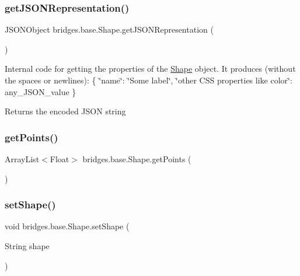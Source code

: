 \mbox{\label{classbridges_1_1base_1_1_shape_a0825361728503d29732b75d6344563d5}} 
\subsubsection{\texorpdfstring{get\+J\+S\+O\+N\+Representation()}{getJSONRepresentation()}}
{\footnotesize\ttfamily J\+S\+O\+N\+Object bridges.\+base.\+Shape.\+get\+J\+S\+O\+N\+Representation (\begin{DoxyParamCaption}{ }\end{DoxyParamCaption})}

Internal code for getting the properties of the \mbox{\hyperlink{classbridges_1_1base_1_1_shape}{Shape}} object. It produces (without the spaces or newlines)\+: \{ \char`\"{}name\char`\"{}\+: \char`\"{}\+Some label\char`\"{}, \char`\"{}other C\+S\+S properties like color\char`\"{}\+: any\+\_\+\+J\+S\+O\+N\+\_\+value \} \begin{DoxyReturn}{Returns}
the encoded J\+S\+ON string 
\end{DoxyReturn}
\mbox{\label{classbridges_1_1base_1_1_shape_ad8addc2d4ba18e1818648b8992ef1a0c}} 
\subsubsection{\texorpdfstring{get\+Points()}{getPoints()}}
{\footnotesize\ttfamily Array\+List$<$Float$>$ bridges.\+base.\+Shape.\+get\+Points (\begin{DoxyParamCaption}{ }\end{DoxyParamCaption})}

\mbox{\label{classbridges_1_1base_1_1_shape_aee070bfb54f51f7fe492f8a42ca6c052}} 
\subsubsection{\texorpdfstring{set\+Shape()}{setShape()}}
{\footnotesize\ttfamily void bridges.\+base.\+Shape.\+set\+Shape (\begin{DoxyParamCaption}\item[{String}]{shape }\end{DoxyParamCaption})}

